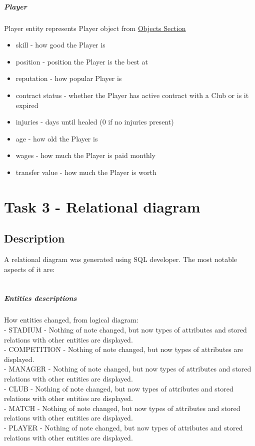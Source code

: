 \documentclass{report}
\begin{document}
\paragraph{Player}
Player entity represents Player object from \hyperref[Objects Section]{Objects Section}
\begin{itemize}
    \item skill - how good the Player is
    \item position - position the Player is the best at
    \item reputation - how popular Player is
    \item contract status - whether the Player has active contract with a Club or is it expired
    \item injuries - days until healed (0 if no injuries present)
    \item age - how old the Player is
    \item wages - how much the Player is paid monthly
    \item transfer value - how much the Player is worth
\end{itemize}

\chapter{Task 3 - Relational diagram}
\section{Description}
A relational diagram was generated using SQL developer. The most notable aspects of it are:\\
\\
\paragraph{Entities descriptions}
How entities changed, from logical diagram:\\
- STADIUM - Nothing of note changed, but now types of attributes and stored relations with other entities are displayed.\\
- COMPETITION - Nothing of note changed, but now types of attributes are displayed.\\
- MANAGER - Nothing of note changed, but now types of attributes and stored relations with other entities are displayed.\\
- CLUB - Nothing of note changed, but now types of attributes and stored relations with other entities are displayed.\\
- MATCH - Nothing of note changed, but now types of attributes and stored relations with other entities are displayed.\\
- PLAYER - Nothing of note changed, but now types of attributes and stored relations with other entities are displayed.\\
\end{document}
